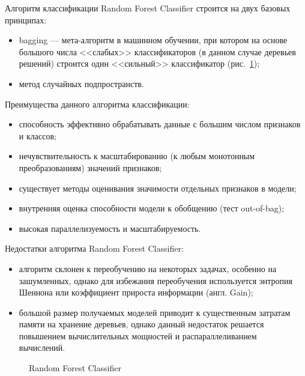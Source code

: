 Алгоритм классификации Random Forest Classifier строится на двух базовых принципах: 
\begin{itemize}
  \item bagging --- мета-алгоритм в машинном обучении, при котором на основе большого числа <<слабых>> классификаторов (в данном случае деревьев решений) строится один <<сильный>> классификатор (рис.~\ref{forest:forest});
  \item метод случайных подпространств.
\end{itemize}

Преимущества данного алгоритма классификации:
\begin{itemize}
  \item способность эффективно обрабатывать данные с большим числом признаков и классов;
  \item нечувствительность к масштабированию (к любым монотонным преобразованиям) значений признаков;
  \item существует методы оценивания значимости отдельных признаков в модели;
  \item внутренняя оценка способности модели к обобщению (тест out-of-bag);
  \item высокая параллелизуемость и масштабируемость.
\end{itemize}

Недостатки алгоритма Random Forest Classifier:
\begin{itemize}
  \item алгоритм склонен к переобучению на некоторых задачах, особенно на зашумленных, однако для избежания переобучения используется энтропия Шеннона или коэффициент прироста информации (англ. Gain);
  \item большой размер получаемых моделей приводит к существенным затратам памяти на хранение деревьев, однако данный недостаток решается повышением вычислительных мощностей и распараллеливанием вычислений.~\cite{random_forest}
\end{itemize}

\begin{figure}[h!]
\caption{ Random Forest Classifier }
\label{forest:forest}
\end{figure} 
